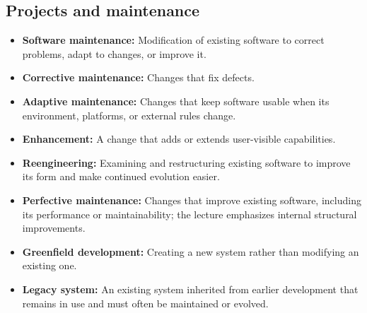 \documentclass[11pt]{article}
\newenvironment{DottedList}{%
  \begin{itemize}[leftmargin=2em, itemsep=0.35em, topsep=0.35em, label=\textbullet]
}{%
  \end{itemize}
}
\begin{document}
\subsection*{Projects and maintenance}
\begin{DottedList}
  \item \textbf{Software maintenance:} Modification of existing software to correct problems, adapt to changes, or improve it.
  \item \textbf{Corrective maintenance:} Changes that fix defects.
  \item \textbf{Adaptive maintenance:} Changes that keep software usable when its environment, platforms, or external rules change.
  \item \textbf{Enhancement:} A change that adds or extends user-visible capabilities.
  \item \textbf{Reengineering:} Examining and restructuring existing software to improve its form and make continued evolution easier.
  \item \textbf{Perfective maintenance:} Changes that improve existing software, including its performance or maintainability; the lecture emphasizes internal structural improvements.
  \item \textbf{Greenfield development:} Creating a new system rather than modifying an existing one.
  \item \textbf{Legacy system:} An existing system inherited from earlier development that remains in use and must often be maintained or evolved.
\end{DottedList}
\end{document}
